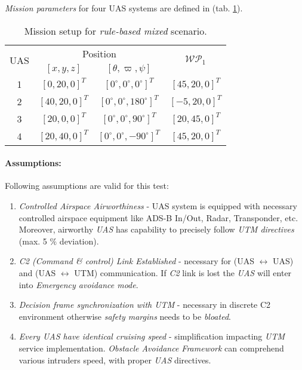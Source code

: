 \noindent\emph{Mission parameters} for four UAS systems are defined in (tab. \ref{tab:missionSetupRuleBasedMixedScenario}).

\begin{table}[H]
	\centering
	\begin{tabular}{c||c|c||c}
		\multirow{2}{*}{UAS} &\multicolumn{2}{c||}{Position} & \multirow{2}{*}{$\mathscr{WP}_1$} \\\cline{2-3}
		  & $[x,y,z]$           & $[\theta,\varpi,\psi]$           & \\\hline\hline
		1 & $[0,20,0]^T $       & $[0^\circ,0^\circ,0^\circ]^T$    & $[45,20,0]^T$\\\hline 
		2 & $[40,20,0]^T $       & $[0^\circ,0^\circ,180^\circ]^T$    & $[-5,20,0]^T$\\\hline 
		3 & $[20,0,0]^T $       & $[0^\circ,0^\circ,90^\circ]^T$    & $[20,45,0]^T$\\\hline 
		4 & $[20,40,0]^T $       & $[0^\circ,0^\circ,-90^\circ]^T$  & $[45,20,0]^T$\\ 
	\end{tabular}
	\caption{Mission setup for \emph{rule-based mixed} scenario.}
	\label{tab:missionSetupRuleBasedMixedScenario}
\end{table}

\paragraph{Assumptions:} Following assumptions are valid for this test:

\begin{enumerate}
	\item \emph{Controlled Airspace Airworthiness} - UAS system is equipped with necessary controlled airspace equipment like ADS-B In/Out, Radar, Transponder, etc. Moreover, airworthy \emph{UAS} has capability to precisely follow \emph{UTM directives} (max. 5 $\%$ deviation).
	
	\item \emph{C2 (Command \& control) Link Established} - necessary for (UAS $\leftrightarrow$ UAS) and (UAS $\leftrightarrow$ UTM) communication. If \emph{C2} link is lost the \emph{UAS} will enter into \emph{Emergency avoidance mode}.
	
	\item \emph{Decision frame synchronization with UTM} - necessary in discrete C2 environment otherwise \emph{safety margins} needs to be \emph{bloated}.
	
	\item \emph{Every UAS have identical cruising speed} - simplification impacting \emph{UTM} service implementation. \emph{Obstacle Avoidance Framework} can comprehend various intruders speed, with proper \emph{UAS} directives.
\end{enumerate}

